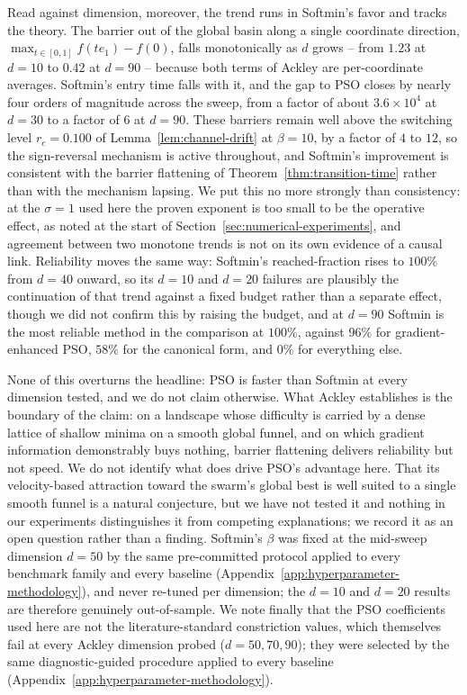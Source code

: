 \documentclass{article}
\theoremstyle{plain}
\theoremstyle{definition}
\theoremstyle{remark}
\begin{document}
Read against dimension, moreover, the trend runs in Softmin's favor and tracks the theory. The barrier out of the global basin along a single coordinate direction, $\max_{t\in[0,1]}f(te_1)-f(0)$, falls monotonically as $d$ grows -- from $1.23$ at $d=10$ to $0.42$ at $d=90$ -- because both terms of Ackley are per-coordinate averages. Softmin's entry time falls with it, and the gap to PSO closes by nearly four orders of magnitude across the sweep, from a factor of about $3.6\times10^4$ at $d=30$ to a factor of $6$ at $d=90$. These barriers remain well above the switching level $r_c=0.100$ of Lemma~\ref{lem:channel-drift} at $\beta=10$, by a factor of $4$ to $12$, so the sign-reversal mechanism is active throughout, and Softmin's improvement is consistent with the barrier flattening of Theorem~\ref{thm:transition-time} rather than with the mechanism lapsing. We put this no more strongly than consistency: at the $\sigma=1$ used here the proven exponent is too small to be the operative effect, as noted at the start of Section~\ref{sec:numerical-experiments}, and agreement between two monotone trends is not on its own evidence of a causal link. Reliability moves the same way: Softmin's reached-fraction rises to $100\%$ from $d=40$ onward, so its $d=10$ and $d=20$ failures are plausibly the continuation of that trend against a fixed budget rather than a separate effect, though we did not confirm this by raising the budget, and at $d=90$ Softmin is the most reliable method in the comparison at $100\%$, against $96\%$ for gradient-enhanced PSO, $58\%$ for the canonical form, and $0\%$ for everything else.

None of this overturns the headline: PSO is faster than Softmin at every dimension tested, and we do not claim otherwise. What Ackley establishes is the boundary of the claim: on a landscape whose difficulty is carried by a dense lattice of shallow minima on a smooth global funnel, and on which gradient information demonstrably buys nothing, barrier flattening delivers reliability but not speed. We do not identify what does drive PSO's advantage here. That its velocity-based attraction toward the swarm's global best is well suited to a single smooth funnel is a natural conjecture, but we have not tested it and nothing in our experiments distinguishes it from competing explanations; we record it as an open question rather than a finding. Softmin's $\beta$ was fixed at the mid-sweep dimension $d=50$ by the same pre-committed protocol applied to every benchmark family and every baseline (Appendix~\ref{app:hyperparameter-methodology}), and never re-tuned per dimension; the $d=10$ and $d=20$ results are therefore genuinely out-of-sample. We note finally that the PSO coefficients used here are not the literature-standard constriction values, which themselves fail at every Ackley dimension probed ($d=50,70,90$); they were selected by the same diagnostic-guided procedure applied to every baseline (Appendix~\ref{app:hyperparameter-methodology}).
\end{document}
